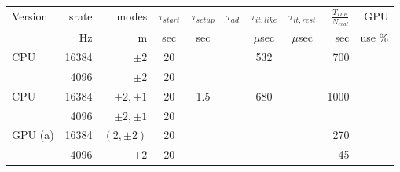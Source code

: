 \documentclass[twocolumn,prd,nofootinbib]{revtex4}
\begin{document}
\begin{table*}
\begin{tabular}{lrr|ccccc|rr}
Version & srate & modes & $\tau_{start}$ & $\tau_{setup}$ & $\tau_{ad}$ & $\tau_{it,like}$ &$\tau_{it,rest}$ &
$\frac{T_{ILE}}{N_{eval}}$ & GPU \\  %
  &   Hz & m & sec & sec & & $\mu$sec & $\mu$sec  &sec  & use  \%\\ \hline 
CPU & 16384 & $\pm 2 $ & 20 & &&532 & &  700  \\ 
       & 4096 & $\pm 2 $ &   20 \\ \hline
%    
CPU & 16384 & $\pm 2,\pm 1 $ & 20 & 1.5 && 680 & &  1000  \\ 
       & 4096 & $ \pm 2, \pm 1 $ &   20 \\ \hline
GPU (a) & 16384 & $(2,\pm 2) $  & 20  & & && & 270 \\
            & 4096 &$\pm 2 $  &  20 &  & & && 45 \\ \hline

\end{tabular}
\end{table*}
\end{document}
